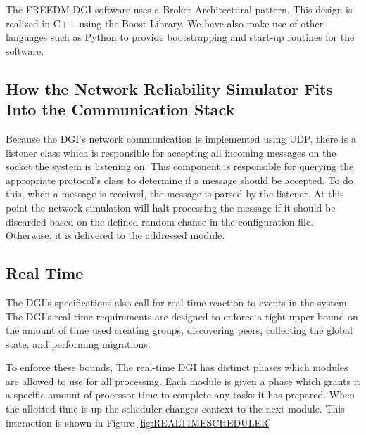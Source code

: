 The FREEDM DGI software uses a Broker Architectural pattern. This design is 
realized in C++ using the Boost Library\cite{BOOST}. We have also make use of 
other languages such as Python to provide bootstrapping and start-up routines 
for the software.

\subsection{How the Network Reliability Simulator Fits Into the Communication 
Stack}

Because the DGI's network communication is implemented using UDP, there is a 
listener class which is responsible for accepting all incoming messages on the 
socket the system is listening on. This component is responsible for querying 
the appropriate protocol's class to determine
if a message should be accepted. To do this, when a message is received, the 
message is parsed by the listener. At this point the network simulation will 
halt processing the  message if it should be discarded based on the defined 
random chance in the configuration file. Otherwise, it is delivered to the 
addressed module.

\subsection{Real Time}
The DGI's specifications also call for real time reaction to events in the
system. The DGI's real-time requirements are designed to enforce a tight
upper bound on the amount of time used creating groups, discovering peers,
collecting the global state, and performing migrations.

To enforce these bounds, The real-time DGI has distinct phases which modules
are allowed to use for all processing. Each module is given a phase which
grants it a specific amount of processor time to complete any tasks it has
prepared. When the allotted time is up the scheduler changes context to the
next module. This interaction is shown in Figure \ref{fig:REALTIMESCHEDULER}

